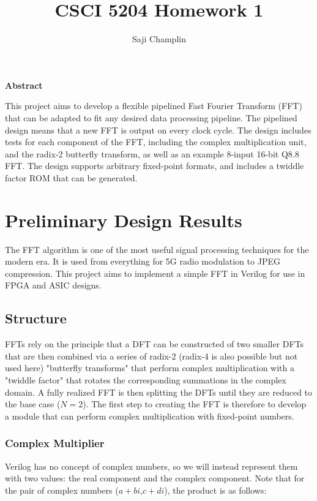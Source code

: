 \documentclass[12pt]{article}
\author{Saji Champlin}
\title{CSCI 5204 Homework 1}
\date{}
\begin{document}
\maketitle

    
\vspace{1cm}

\begin{center}
	\textbf{Abstract}
\end{center}
This project aims to develop a flexible pipelined Fast Fourier Transform (FFT)
that can be adapted to fit any desired data processing pipeline. The pipelined
design means that a new FFT is output on every clock cycle. The design includes
tests for each component of the FFT, including the complex multiplication unit,
and the radix-2 butterfly transform, as well as an example 8-input 16-bit Q8.8
FFT. The design supports arbitrary fixed-point formats, and includes a twiddle
factor ROM that can be generated.

\pagebreak

\section{Preliminary Design Results}
The FFT algorithm is one of the most useful signal processing techniques for
the modern era. It is used from everything for 5G radio modulation to JPEG
compression. This project aims to implement a simple FFT in Verilog for use in
FPGA and ASIC designs.

\subsection{Structure}
FFTs rely on the principle that a DFT can be constructed of two smaller DFTs
that are then combined via a series of radix-2 (radix-4 is also possible but
not used here) "butterfly transforms" that perform complex multiplication with
a "twiddle factor" that rotates the corresponding summations in the complex
domain. A fully realized FFT is then splitting the DFTs until they are reduced
to the base case ($N=2$). The first step to creating the FFT is therefore to
develop a module that can perform complex multiplication with fixed-point
numbers.

\subsubsection{Complex Multiplier}

Verilog has no concept of complex numbers, so we will instead represent them
with two values: the real component and the complex component. Note that for
the pair of complex numbers ($a + bi$,$c +di$), the product is as follows:
\end{document}
